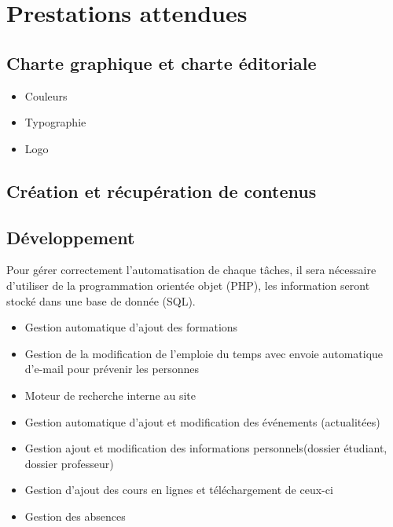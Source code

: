\documentclass[oneside]{report}
\newcommand{\writecol}[1] {
	\subitem{\textcolor[HTML]{#1}{\# #1}}
}
\begin{document}
	\chapter{Prestations attendues}
	{
		\section{Charte graphique et charte éditoriale}
			\begin{itemize}
				\item{Couleurs}
					\writecol{639D35}
					\writecol{040707}
					\writecol{868786}
					\writecol{005899}
				\item{Typographie}
				\item{Logo}
			\end{itemize}
		\section{Création et récupération de contenus}
		\section{Développement}
		\par Pour gérer correctement l’automatisation de chaque tâches, il sera nécessaire d’utiliser de la programmation orientée objet (PHP), les information seront stocké dans une base de donnée (SQL).
		\par
		\begin{itemize}
			\item Gestion automatique d’ajout des formations
			\item Gestion de la modification de l’emploie du temps avec envoie automatique d'e-mail pour prévenir les personnes
			\item Moteur de recherche interne au site
			\item Gestion automatique d’ajout et modification des événements (actualitées)
			\item Gestion ajout et modification des informations personnels(dossier étudiant, dossier professeur)
			\item Gestion d’ajout des cours en lignes et téléchargement de ceux-ci
			\item Gestion des absences
		\end{itemize}
}
\end{document}
